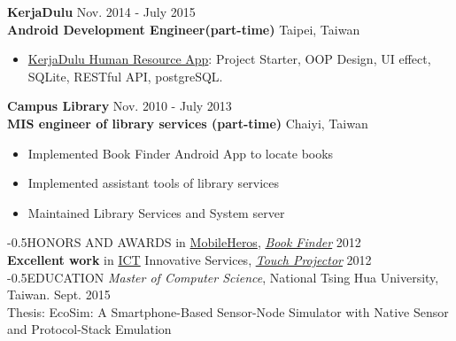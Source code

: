 \documentclass{res}
\makeatletter
\renewcommand{\section}{\@startsection{section}{1}{0mm}
  {-\baselineskip}{0.5\baselineskip}{\bf\leftline}}
\makeatother
\begin{document}
\begin{resume}
	 			{\bf KerjaDulu }                                {\hfill  Nov. 2014 - July 2015}\\
				{\bf Android Development Engineer(part-time)}			    	 {\hfill Taipei, Taiwan}
		
				\begin{itemize}[leftmargin=*]
					\item {\href{https://play.google.com/store/apps/details?id=com.kerjadulu.kerjadulu&hl=zh_TW}{KerjaDulu Human Resource App}}: Project Starter, OOP Design, UI effect, SQLite, RESTful API, postgreSQL.
				\end{itemize}
				\vspace{-0.12in}

				{\bf Campus Library}                            {\hfill  Nov. 2010 - July 2013}\\
				{\bf MIS engineer of library services (part-time)}            {\hfill Chaiyi, Taiwan}
				\begin{itemize}[leftmargin=*]
					\item Implemented B​ook Finder Android App to locate books
					\vspace{-0.05in} 
					\item Implemented assistant tools of library services
					\vspace{-0.05in}
					\item Maintained Library Services and System server
				\end{itemize}

			\vspace{-0.1in}
			\section{HONORS AND AWARDS}  
			    \vspace{-0.25in}
				 in \href{https://www.mobilehero.com/component/k2/item/209-a2012_11-10.html?Itemid=196}{MobileHeros}, \href{https://www.youtube.com/watch?v=BvLKtrgq_yw}{\sl B​ook Finder} \hfill 2012\\
				{\bf Excellent work} in \href{http://innoserve.tca.org.tw/en/index.aspx}{ICT} Innovative Services, \href{https://www.youtube.com/watch?v=nt4eUAXqXyk}{\sl T​ouch Projector​} \hfill 2012\\  
	
			\vspace{-0.25in}
			\section{EDUCATION}
			\vspace{-0.25in}
				{\sl Master of Computer Science}, National Tsing Hua University, Taiwan. \hfill Sept. 2015\\
				{\footnotesize Thesis: EcoSim: A Smartphone-Based Sensor-Node Simulator with Native Sensor and Protocol-Stack Emulation}


\end{resume}
\end{document}
